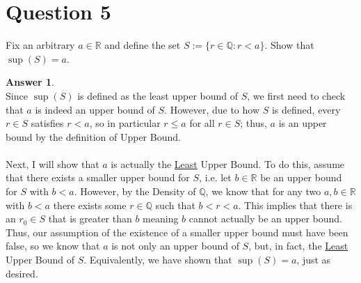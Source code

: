 \documentclass[10pt,a4paper]{article}
\theoremstyle{definition}
\newtheorem*{answer*}{Answer}
\begin{document}
\newpage

\section*{Question 5}
Fix an arbitrary $a \in \mathbb{R}$ and define the set $S := \{r \in \mathbb{Q}: r < a\}$. Show that $\sup(S) = a$.

\begin{answer*}{$ $}
\\Since $\sup(S)$ is defined as the least upper bound of $S$, we first need to check that $a$ is indeed an upper bound of $S$. However, due to how $S$ is defined, every $r \in S$ satisfies $r < a$, so in particular $r \leq a$ for all $r \in S$; thus, $a$ is an upper bound by the definition of Upper Bound.
\\
\\Next, I will show that $a$ is actually the \underline{Least} Upper Bound. To do this, assume that there exists a smaller upper bound for $S$, i.e. let $b \in \mathbb{R}$ be an upper bound for $S$ with $b < a$. However, by the Density of $\mathbb{Q}$, we know that for any two $a, b \in \mathbb{R}$ with $b < a$ there exists some $r \in \mathbb{Q}$ such that $b < r < a$. This implies that there is an $r_0 \in S$ that is greater than $b$ meaning $b$ cannot actually be an upper bound. Thus, our assumption of the existence of a smaller upper bound must have been false, so we know that $a$ is not only an upper bound of $S$, but, in fact, the \underline{Least} Upper Bound of $S$. Equivalently, we have shown that $\sup(S) = a$, just as desired. 
\end{answer*}
\end{document}
